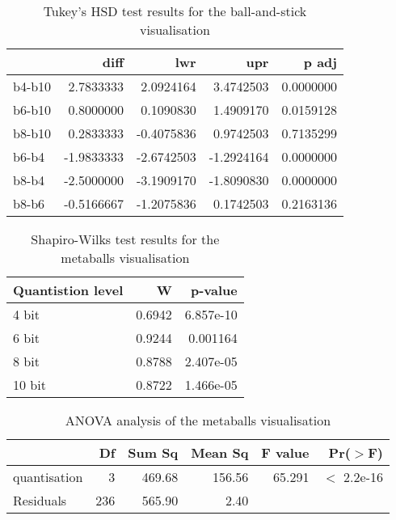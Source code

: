 \begin{table}
  \begin{tabular}{ | l | r | r | r | r |}
  \hline
         &       diff &        lwr &        upr &     p adj  \\ \hline
  b4-b10 &  2.7833333 &  2.0924164 &  3.4742503 & 0.0000000  \\ \hline
  b6-b10 &  0.8000000 &  0.1090830 &  1.4909170 & 0.0159128  \\ \hline
  b8-b10 &  0.2833333 & -0.4075836 &  0.9742503 & 0.7135299  \\ \hline
  b6-b4  & -1.9833333 & -2.6742503 & -1.2924164 & 0.0000000  \\ \hline
  b8-b4  & -2.5000000 & -3.1909170 & -1.8090830 & 0.0000000  \\ \hline
  b8-b6  & -0.5166667 & -1.2075836 &  0.1742503 & 0.2163136  \\ \hline
  \end{tabular}
  \caption{Tukey's HSD test results for the ball-and-stick visualisation}
  \label{tab:appendix_ballstick_tukeyhsd}
\end{table}


\begin{table}
  \begin{tabular}{ | l | r | r | }
  \hline
  Quantistion level &      W &   p-value  \\ \hline
  4 bit             & 0.6942 & 6.857e-10  \\ \hline
  6 bit             & 0.9244 &  0.001164  \\ \hline
  8 bit             & 0.8788 & 2.407e-05  \\ \hline
  10 bit            & 0.8722 & 1.466e-05  \\ \hline
  \end{tabular}
  \caption{Shapiro-Wilks test results for the metaballs visualisation}
  \label{tab:appendix_metaballs_normality}
\end{table}


\begin{table}
  \begin{tabular}{ | l | r | r | r | r | r | }
  \hline
               &  Df & Sum Sq & Mean Sq & F value &    Pr($>$F)  \\ \hline
  quantisation &   3 & 469.68 &  156.56 &  65.291 & $<$ 2.2e-16  \\ \hline
  Residuals    & 236 & 565.90 &    2.40 &         &              \\ \hline
  \end{tabular}
  \caption{ANOVA analysis of the metaballs visualisation}
  \label{tab:appendix_metaballs_anova}
\end{table}


